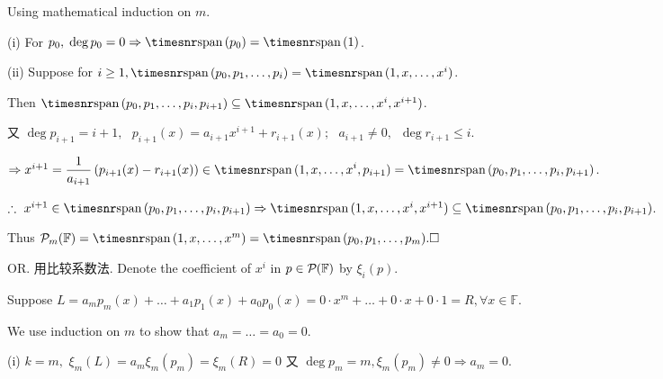 \documentclass[a4paper, 11pt, UTF8]{article}
\def\Spn{{\timesnr\textup{span}}\,}
\def\Fbb{{\mathbb{F}}}
\def\Endi{\hspace{-2.5pt}}
\def\Hi{\quad\hspace{6.5pt}}
\def\Or{\large O{\footnotesize R.} }
\begin{document}
\begin{large}
\par\quad
{\Large\vspace{4pt}Using mathematical induction on $m$.}\par\quad
(i) {\Large\vspace{8pt}For $p_0,\;\deg p_0=0\Rightarrow\Spn(p_0)=\Spn(1)$.}\par\quad\Endi
(ii) {\Large\vspace{4pt}Suppose for $i\geq 1,\Spn(p_0,p_1,\dots,p_i)=\Spn(1,x,\dots,x^i)$.}\par\quad\Hi
{\Large\vspace{4pt}Then $\Spn(p_0,p_1,\dots,p_i,p_{i+1})\subseteq\Spn(1,x,\dots,x^i,x^{i+1})$.}\par\quad\Hi
又 {\Large\vspace{4pt}$\deg p_{i+1}=i+1,\,\,\,\,p_{i+1}(x)=a_{i+1}x^{i+1}+r_{i+1}(x);\,\,\,\,a_{i+1}\neq 0,\,\,\,\deg r_{i+1}\leq i.$}
\par\vspace{2pt}\quad\Hi
{\Large\vspace{4pt}$\Rightarrow x^{i+1}=\displaystyle\frac{1}{a_{i+1}}\left(p_{i+1}(x)-r_{i+1}(x)\right)\in\Spn(1,x,\dots,x^i,p_{i+1})=\Spn(p_0,p_1,\dots,p_i,p_{i+1})$.}\par\vspace{2pt}\quad\Hi
{\Large\vspace{8pt}$\therefore\,\,x^{i+1}\in\Spn(p_0,p_1,\dots,p_i,p_{i+1})\Rightarrow\Spn(1,x,\dots,x^i,x^{i+1})\subseteq\Spn(p_0,p_1,\dots,p_i,p_{i+1})$.}\par\quad
{\Large\vspace{4pt}Thus $\PoF{m}=\Spn(1,x,\dots,x^m)=\Spn(p_0,p_1,\dots,p_m).\hfill\square$}\vspace{14pt}\par\quad
\Or 用比较系数法. {\Large\vspace{4pt}Denote the coefficient of $x^i$ in $p\in\PoF{}$ by $\xi_i(p).$}\par\quad
{\Large\vspace{4pt}Suppose $L=a_m p_m(x)+\dots+a_1 p_1(x)+a_0p_0(x)=0\cdot x^m+\dots+0\cdot x+0\cdot 1=R,\forall x\in\Fbb.$}\par\quad
{\Large\vspace{4pt}We use induction on $m$ to show that $a_m=\dots=a_0=0.$}\par\quad
(i) {\Large\vspace{4pt}$k=m,$ \;$\xi_{m}(L)=a_{m}\xi_{m}(p_m)=\xi_{m}(R)=0$ 又 $\deg p_m=m,\xi_{m}(p_m)\neq 0\Rightarrow a_m=0.$}\par\quad\Hi

\end{large}
\end{document}

